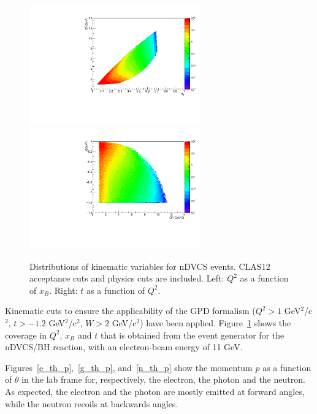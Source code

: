 \begin{figure}[t]
\begin{center}
\includegraphics[width=2.9in]{q2vsxb_FT.pdf}
\includegraphics[width=2.9in]{tvsq2_FT.pdf}
\caption [Distributions of kinematic variables for nDVCS events]
{Distributions of kinematic variables for nDVCS events. CLAS12 acceptance cuts and physics cuts are included. Left: $Q^2$ as a function of $x_B$. Right: $t$ as a function of $Q^2$.}
\label{kine_vars}
\end{center}
\end{figure}
Kinematic cuts to ensure the applicability of the GPD formalism ($Q^2>1$ GeV$^2$/c$^2$, $t>-1.2$ GeV$^2$/c$^2$, $W>2$ GeV/c$^2$) have been applied. Figure~\ref{kine_vars} shows the coverage in $Q^2$, $x_B$ and $t$ that is obtained from the event generator for the nDVCS/BH reaction, with an electron-beam energy of 11 GeV. 

 Figures~\ref{e_th_p},~\ref{g_th_p}, and~\ref{n_th_p} show the momentum $p$ as a function of $\theta$ in the lab frame for, respectively, the electron, the photon and the neutron. As expected, the electron and the photon are mostly emitted at forward angles, while the neutron recoils at backwards angles. 

